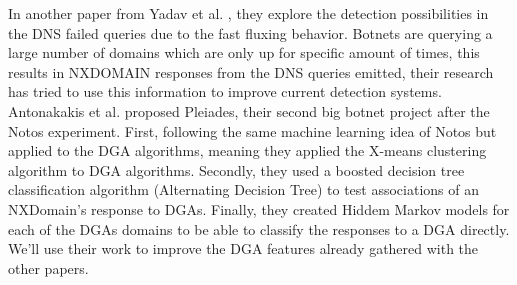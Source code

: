 In another paper from Yadav et al. \cite{dnsfailure}, they explore the detection possibilities in the DNS failed queries due to the fast fluxing behavior. Botnets are querying a large number of domains which are only up for specific amount of times, this results in NXDOMAIN responses from the DNS queries emitted, their research has tried to use this information to improve current detection systems.\\

Antonakakis et al. \cite{pleiades} proposed Pleiades, their second big botnet project after the Notos experiment. First, following the same machine learning idea of Notos but applied to the DGA algorithms, meaning they applied the X-means clustering algorithm to DGA algorithms. Secondly, they used a boosted decision tree classification algorithm (Alternating Decision Tree) to test associations of an NXDomain's response to  DGAs. Finally, they created Hiddem Markov models for each of the DGAs domains to be able to classify the responses to a DGA directly. We'll use their work to improve the DGA features already gathered with the other papers.


